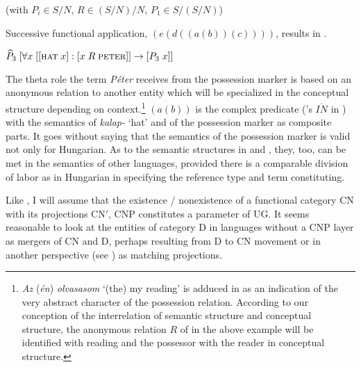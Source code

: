 \documentclass[output=paper,colorlinks,citecolor=brown]{langscibook}
\begin{document}
    (with $P_{i} \in S/N$, $R \in (S/N)/N$, ${P}_{1} \in S/(S/N)$)
    \z
\z

\noindent Successive functional application, $(e(d((a(b))(c))))$, results in .

\ea \label{ex:zi91:21} $\widehat{P}_{3} \; [\forall x \; [[\textsc{hat} \; x] : [x \; R \; \textsc{peter}]] \rightarrow [P_{3} \; x]]$
\z

\noindent The theta role the term \textit{Péter} receives from the possession marker is based on an anonymous relation to another entity which will be specialized in the conceptual structure depending on context.\footnote{\label{fn:zi91:14}\textit{Az} (\textit{én}) \textit{olvasasom} `(the) my reading' is adduced in \citet[n. 5]{Melcuk73On-the-possessive-form} as an indication of the very abstract character of the possession relation. According to our conception of the interrelation of semantic structure and conceptual structure, the anonymous relation $R$ of  in the above example will be identified with reading and the possessor with the reader in conceptual structure.} $(a(b))$ is the complex predicate (\citeauthor{Szabolosi87Functional-categories}'s \citeyear{Szabolosi87Functional-categories} $\overline{IN}$ in ) with the semantics of \textit{kalap-} `hat' and of the possession marker as composite parts. It goes without saying that the semantics of the possession marker is valid not only for Hungarian. As to the semantic structures in  and , they, too, can be met in the semantics of other languages, provided there is a comparable division of labor as in Hungarian in specifying the reference type and term constituting.

Like \citet{Abney87The-English}, I will assume that the existence / nonexistence of a functional category CN with its projections CN$'$, CNP constitutes a parameter of UG. It seems reasonable to look at the entities of category D in languages without a CNP layer as mergers of CN and D, perhaps resulting from D to CN movement or in another perspective (see \citealt{Haider88Die-Struktur}) as matching projections.
\end{document}

